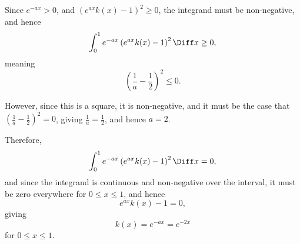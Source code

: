 \begin{enumerate}
          Since \(e^{-ax} > 0\), and \(\left(e^{ax} k(x) - 1\right)^2 \geq 0\), the integrand must be non-negative, and hence
          \[
              \int_{0}^{1} e^{-ax} \left(e^{ax} k(x)- 1\right)^2 \Diff x \geq 0,
          \]
          meaning
          \[
              \left(\frac{1}{a} - \frac{1}{2}\right)^2 \leq 0.
          \]

          However, since this is a square, it is non-negative, and it must be the case that \(\left(\frac{1}{a} - \frac{1}{2}\right)^2 = 0\), giving \(\frac{1}{a} = \frac{1}{2}\), and hence \(a = 2\).

          Therefore,
          \[
              \int_{0}^{1} e^{-ax} \left(e^{ax} k(x)- 1\right)^2 \Diff x = 0,
          \]
          and since the integrand is continuous and non-negative over the interval, it must be zero everywhere for \(0 \leq x \leq 1\), and hence
          \[
              e^{ax} k(x) - 1 = 0,
          \]
          giving
          \[
              k(x) = e^{-ax} = e^{-2x}
          \]
          for \(0 \leq x \leq 1\).
\end{enumerate}